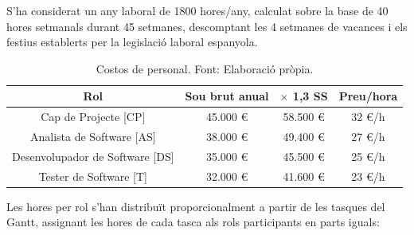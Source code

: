 \documentclass[12pt,a4paper,twoside]{report}
\begin{document}
S'ha considerat un any laboral de 1800 hores/any, calculat sobre la base de 40 hores setmanals durant 45 setmanes, descomptant les 4 setmanes de vacances i els festius establerts per la legislaci\'o laboral espanyola.

\begin{table}[H]
\centering
\caption{Costos de personal. Font: Elaboraci\'o pr\`opia.}
\label{tab:costos-personal}
\begin{tabular}{@{}cccc@{}}
\toprule
\textbf{Rol} & \textbf{Sou brut anual} & \textbf{$\times$ 1,3 SS} & \textbf{Preu/hora} \\
\midrule
Cap de Projecte [CP] & 45.000 \euro & 58.500 \euro & 32 \euro/h \\
Analista de Software [AS] & 38.000 \euro & 49.400 \euro & 27 \euro/h \\
Desenvolupador de Software [DS] & 35.000 \euro & 45.500 \euro & 25 \euro/h \\
Tester de Software [T] & 32.000 \euro & 41.600 \euro & 23 \euro/h \\
\bottomrule
\end{tabular}
\end{table}

Les hores per rol s'han distribu\"it proporcionalment a partir de les tasques del Gantt, assignant les hores de cada tasca als rols participants en parts iguals:
\end{document}
